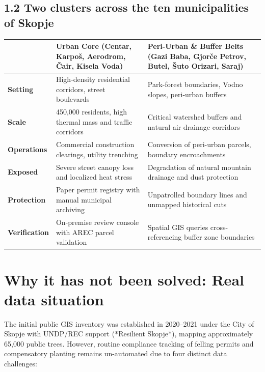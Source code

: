 \documentclass[9pt,a4paper]{article}
\begin{document}
\vspace{0.2em}
\subsection*{1.2 Two clusters across the ten municipalities of Skopje}
\renewcommand{\arraystretch}{0.92}
\begin{tabularx}{\textwidth}{@{}lXX@{}}
\toprule
& \textsf{\textbf{\fontsize{8pt}{10pt}\selectfont Urban Core (Centar, Karpo\v{s}, Aerodrom, \v{C}air, Kisela Voda)}} & \textsf{\textbf{\fontsize{8pt}{10pt}\selectfont Peri-Urban \& Buffer Belts (Gazi Baba, Gjor\v{c}e Petrov, Butel, \v{S}uto Orizari, Saraj)}} \\
\midrule
\textbf{Setting} & High-density residential corridors, street boulevards & Park-forest boundaries, Vodno slopes, peri-urban buffers \\
\textbf{Scale} & 450,000 residents, high thermal mass and traffic corridors & Critical watershed buffers and natural air drainage corridors \\
\textbf{Operations} & Commercial construction clearings, utility trenching & Conversion of peri-urban parcels, boundary encroachments \\
\textbf{Exposed} & Severe street canopy loss and localized heat stress & Degradation of natural mountain drainage and dust protection \\
\textbf{Protection} & Paper permit registry with manual municipal archiving & Unpatrolled boundary lines and unmapped historical cuts \\
\textbf{Verification} & On-premise review console with AREC parcel validation & Spatial GIS queries cross-referencing buffer zone boundaries \\
\bottomrule
\end{tabularx}

\vspace{0.2em}
\section{Why it has not been solved: Real data situation}
The initial public GIS inventory was established in 2020--2021 under the City of Skopje with UNDP/REC support (*Resilient Skopje*), mapping approximately 65,000 public trees. However, routine compliance tracking of felling permits and compensatory planting remains un-automated due to four distinct data challenges:
\end{document}
